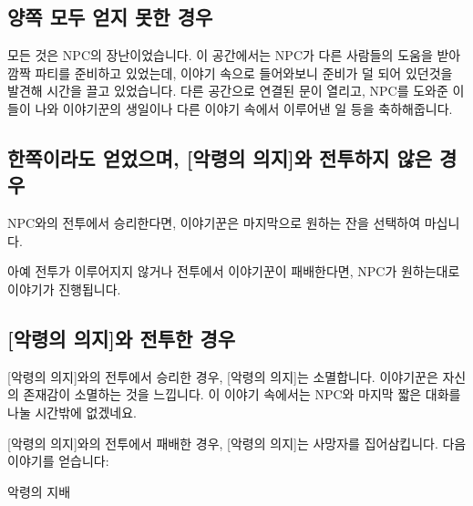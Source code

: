 \documentclass{report}
\begin{document}
		\subsection{양쪽 모두 얻지 못한 경우}
			모든 것은 NPC의 장난이었습니다. 이 공간에서는 NPC가 다른 사람들의 도움을 받아 깜짝 파티를 준비하고 있었는데, 이야기 속으로 들어와보니 준비가 덜 되어 있던것을 발견해 시간을 끌고 있었습니다. 다른 공간으로 연결된 문이 열리고, NPC를 도와준 이들이 나와 이야기꾼의 생일이나 다른 이야기 속에서 이루어낸 일 등을 축하해줍니다.
			
		\subsection{한쪽이라도 얻었으며, [악령의 의지]와 전투하지 않은 경우}
			NPC와의 전투에서 승리한다면, 이야기꾼은 마지막으로 원하는 잔을 선택하여 마십니다.
			
			아예 전투가 이루어지지 않거나 전투에서 이야기꾼이 패배한다면, NPC가 원하는대로 이야기가 진행됩니다.
		
		\subsection{[악령의 의지]와 전투한 경우}
			[악령의 의지]와의 전투에서 승리한 경우, [악령의 의지]는 소멸합니다. 이야기꾼은 자신의 존재감이 소멸하는 것을 느낍니다. 이 이야기 속에서는 NPC와 마지막 짧은 대화를 나눌 시간밖에 없겠네요.
			
			[악령의 의지]와의 전투에서 패배한 경우, [악령의 의지]는 사망자를 집어삼킵니다. 다음 이야기를 얻습니다:
			\begin{lite}{악령의 지배}
			\end{lite}
			
\end{document}
